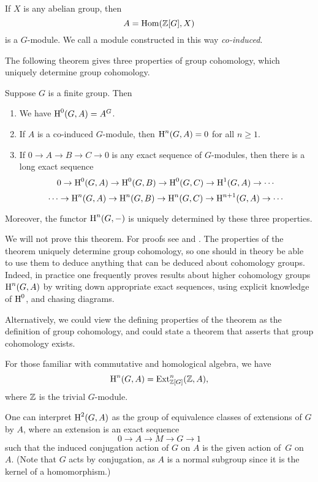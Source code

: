 If $X$ is any abelian group, then
$$
	A = \operatorname{Hom}(\mathbb{Z}[G], X)
$$
is a $G$-module.  We call a module constructed in this way
\emph{co-induced}.

The following theorem gives three properties of group cohomology,
which uniquely determine group cohomology.
\begin{theorem}
Suppose $G$ is a finite group.  Then
\begin{enumerate}
\item We have $\operatorname{H}^0(G,A) = A^G$.
\item If $A$ is a co-induced $G$-module, then $\operatorname{H}^n(G,A) = 0$ for all $n\geq 1$.
\item If $0\to A \to B \to C \to 0$ is any exact sequence of
$G$-modules, then there is a long exact sequence
$$
 0 \to \operatorname{H}^0(G,A) \to \operatorname{H}^0(G,B) \to \operatorname{H}^0(G,C) \to \operatorname{H}^1(G,A) \to \cdots
$$
$$
   \cdots \to \operatorname{H}^{n}(G,A) \to \operatorname{H}^{n}(G,B) \to \operatorname{H}^{n}(G,C) \to \operatorname{H}^{n+1}(G,A) \to \cdots
$$
\end{enumerate}
Moreover, the functor $\operatorname{H}^n(G,-)$ is uniquely determined by
these three properties.
\end{theorem}
We will not prove this theorem.  For proofs see
\cite[Atiyah-Wall]{cassels-frohlich} and
\cite[Ch.~7]{serre:localfields}. The properties of the theorem
uniquely determine group cohomology, so one should in theory be able
to use them to deduce anything that can be deduced about cohomology
groups.  Indeed, in practice one frequently proves results about
higher cohomology groups $\operatorname{H}^n(G,A)$ by writing down appropriate exact
sequences, using explicit knowledge of $\operatorname{H}^0$, and chasing diagrams.

\begin{remark}
  Alternatively, we could view the defining properties of the theorem
  as the definition of group cohomology, and could state a theorem
  that asserts that group cohomology exists.
\end{remark}

\begin{remark}
  For those familiar with commutative and homological algebra, we have
$$
  \operatorname{H}^n(G,A) = \operatorname{Ext}^n_{\mathbb{Z}[G]}(\mathbb{Z}, A),
$$
where $\mathbb{Z}$ is the trivial $G$-module.
\end{remark}

\begin{remark}
  One can interpret $\operatorname{H}^2(G,A)$ as the group of equivalence classes of
  extensions of $G$ by $A$, where an extension is an exact sequence
  $$0\to A \to M \to G \to 1$$ such that the induced conjugation action
  of $G$ on $A$ is the given action of~$G$ on~$A$.
(Note that $G$ acts by conjugation, as $A$ is a normal
subgroup since it is the kernel of a homomorphism.)
\end{remark}


